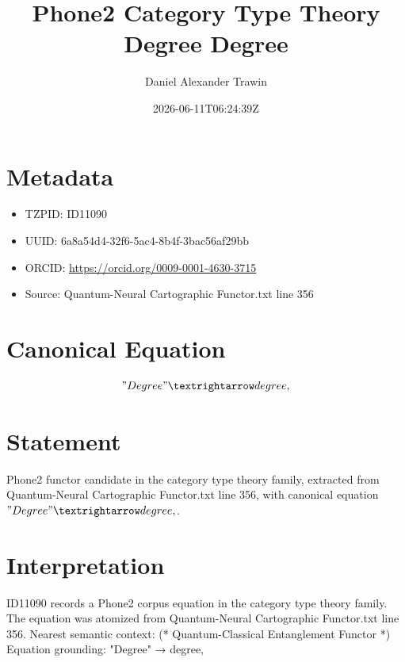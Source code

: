 \documentclass[11pt]{article}
\title{Phone2 Category Type Theory Degree Degree}
\author{Daniel Alexander Trawin}
\date{2026-06-11T06:24:39Z}
\begin{document}
\maketitle
\section*{Metadata}
\begin{itemize}
\item TZPID: ID11090
\item UUID: 6a8a54d4-32f6-5ac4-8b4f-3bac56af29bb
\item ORCID: \url{https://orcid.org/0009-0001-4630-3715}
\item Source: Quantum-Neural Cartographic Functor.txt line 356
\end{itemize}
\section*{Canonical Equation}
\[
"Degree" → degree,
\]
\section*{Statement}
Phone2 functor candidate in the category type theory family, extracted from Quantum-Neural Cartographic Functor.txt line 356, with canonical equation $"Degree" → degree,$.
\section*{Interpretation}
ID11090 records a Phone2 corpus equation in the category type theory family. The equation was atomized from Quantum-Neural Cartographic Functor.txt line 356. Nearest semantic context: (* Quantum-Classical Entanglement Functor *) Equation grounding: "Degree" → degree,
\end{document}
